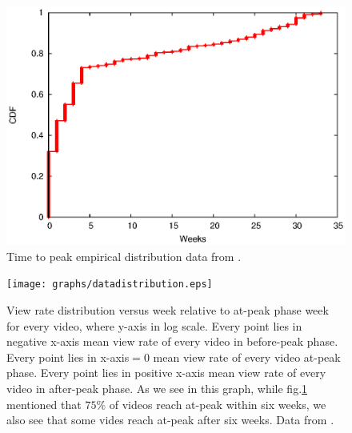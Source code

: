 \documentclass[10pt,final,journal,a4paper]{IEEEtran}
\begin{document}
\begin{figure}[!t]
\begin{center}
\includegraphics[scale=0.6]{graphs/timetopeak.eps}
\end{center}
\caption{Time to peak empirical distribution data from \cite{Borghol:2011:CMP:2039452.2039717}.}
\label{fig:timetopeak}
\end{figure} 


\begin{figure}[!t]
\begin{center}
\texttt{[image: graphs/datadistribution.eps]}
\end{center}
\caption{View rate distribution versus week relative to at-peak phase week for every video, where y-axis in log scale.
Every point lies in negative x-axis mean view rate of every video in before-peak phase.
Every point lies in x-axis$=0$ mean view rate of every video at-peak phase. 
Every point lies in positive x-axis mean view rate of every video in after-peak phase.
As we see in this graph, while fig.\ref{fig:timetopeak} mentioned that $75\%$ of videos reach at-peak within six weeks, we also see that some vides reach at-peak after six weeks.
Data from \cite{Borghol:2011:CMP:2039452.2039717}. }
\label{fig:viewratedistribution}
\end{figure} 

\end{document}
